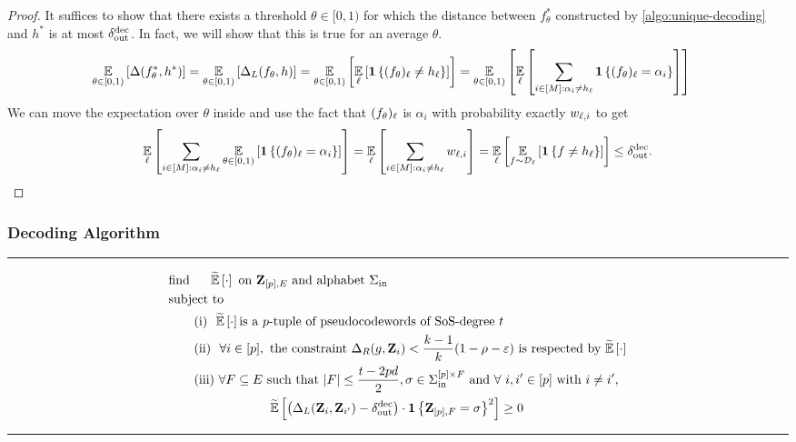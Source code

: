 \begin{proof}
	It suffices to show that there exists a threshold $\theta \in [0,1)$ for which the distance between $f_{\theta}^*$ constructed by \cref{algo:unique-decoding} and $h^*$ is at most $\delta_{\mathrm{out}}^{\mathrm{dec}}$. In fact, we will show that this is true for an average $\theta$.
	\begin{align*}
		\Ex{\theta \in [0,1)}{ \Delta(f_{\theta}^*,h^*)} &= \Ex{\theta \in [0,1)}{ \Delta_L(f_{\theta},h)} = \Ex{\theta \in [0,1)}{ \Ex{\li}{\indi{(f_{\theta})_{\li} \neq h_{\li}}}}  = \Ex{\theta \in [0,1)}{ \Ex{\li}{\sum_{i\in [M] : \alpha_i \neq h_{\li}}\indi{(f_{\theta})_{\li} = \alpha_i}}} 
	\end{align*}
	We can move the expectation over $\theta$ inside and use the fact that $(f_{\theta})_{{ \ell }}$ is $\alpha_i$ with probability exactly $w_{{ \ell },i}$ to get
	\begin{align*}
		\Ex{\li}{\sum_{i\in [M] : \alpha_i \neq h_{\li}} \Ex{\theta \in [0,1)}{\indi{(f_{\theta})_{\li} = \alpha_i}}} =  \Ex{\li}{\sum_{i\in [M] : \alpha_i \neq h_{\li}} w_{\li,i}} = \Ex{\li}{\Ex{f\sim \calD_{\li}}{{\indi{f\neq h_{\li}}}}} \leq \delta_{\out}^{\dec}. \qedhere
	\end{align*}
\end{proof}

\subsubsection{Decoding Algorithm}
\begin{table}[h]
\hrule
\vline
\begin{minipage}[t]{0.99\linewidth}
\vspace{-5 pt}
{\small
\begin{align*}
    &\mbox{find}\quad ~~ \tildeEx{\cdot} ~\text{on}~ \zee_{[p],E} \text{ and alphabet }\Sigma_{\inn}%
    \\
&\mbox{subject to}\quad \quad ~\\
	&\qquad \text{(i)}~~ \tildeEx{\cdot} \text{is a }p\text{-tuple of pseudocodewords of SoS-degree } t \\
    &\qquad \text{(ii)}~~ \forall i \in [p],~ \text{the constraint }\Delta_R(g,\zee_i) < \frac{k-1}{k}(1-\rho-\eps) \text{ is respected by }\tildeEx{\cdot}\label{cons:agreement-ld}    \\
&\qquad \text{(iii)}~ \forall F \sub E \text{ such that } |F|\leq \frac{t-2pd}{2}, \sigma \in \Sigma_{\inn}^{[p]\times F} \text{ and }\forall~i,i' \in [p] \text{ with } i\neq i', \\
&\qquad \qquad \qquad \qquad \tildeEx{\inparen{\Delta_L(\zee_i,\zee_{i'}) - \delta_{\out}^{\dec}}\cdot  \indi{\zee_{[p],F} = \sigma}^2 } \geq 0
\end{align*}}
\vspace{-10 pt}
\end{minipage}
\hfill\vline
\hrule
\caption{$\mathrm{SDP}(p, t)$}
\label{tab:SDP_for_feasibility}
\end{table}

